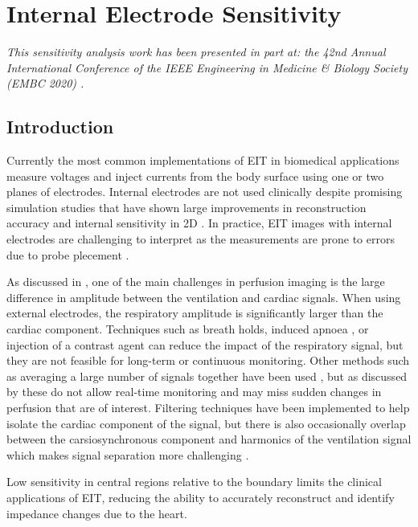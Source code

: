 \chapter{Internal Electrode Sensitivity}
\label{chap:chapter-6}
\emph{This sensitivity analysis work has
 been presented in part at: the 42nd Annual International Conference of the IEEE Engineering 
 in Medicine \& Biology Society (EMBC 2020) \parencite{stowe_effect_2020}.} 

\section{Introduction}
Currently the most common implementations of EIT in biomedical applications
measure voltages and inject currents from the body surface using 
one or two planes of electrodes. Internal electrodes are not used clinically
despite promising simulation studies that have shown large improvements 
in reconstruction accuracy and internal sensitivity in 
2D \parencite{nasehi_tehrani_evaluation_2012,nasehi_tehrani_modelling_2012}. 
In practice, EIT images with internal electrodes are challenging 
to interpret 
as the measurements are prone to errors 
due to probe 
plecement \parencite{czaplik_application_2014}. 

As discussed in , one of the main challenges 
in perfusion imaging is the large difference in amplitude 
between the ventilation and cardiac signals. 
When using external electrodes, the respiratory amplitude is 
significantly larger than the cardiac component. 
Techniques such as 
breath holds, induced apnoea \parencite{leathard_comparison_1994,stowe_comparison_2019}, 
or injection 
of a contrast agent \parencite{frerichs_regional_2002} can reduce the
impact of the respiratory signal, but they are not feasible for 
long-term or continuous monitoring. 
Other methods such as averaging a large number of signals together 
have been used \parencite{eyuboglu_vivo_1989,vonk-noordegraaf_pulmonary_1998}, 
but as discussed by  
these do not allow real-time monitoring and 
may miss sudden changes in perfusion that are of interest.
Filtering techniques have been implemented to help isolate the 
cardiac component of the signal, but there is also occasionally overlap between 
the carsiosynchronous component and harmonics of the ventilation
signal which makes signal separation more 
challenging \parencite{zadehkoochak_pulmonary_1992,leathard_comparison_1994}.

Low sensitivity in central regions relative to the boundary
limits the clinical applications of EIT, reducing the ability to
accurately reconstruct and identify impedance changes due to
the heart.

